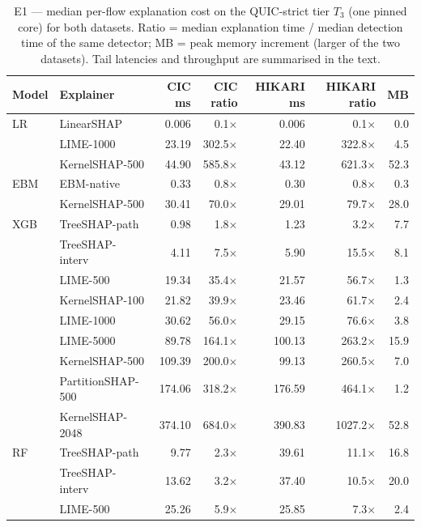 \begin{table}[!htbp]
\centering
\caption{E1 --- median per-flow explanation cost on the QUIC-strict tier $T_3$ (one pinned core) for both datasets. Ratio = median explanation time / median detection time of the same detector; MB = peak memory increment (larger of the two datasets). Tail latencies and throughput are summarised in the text.}
\label{tab:cost}
\scriptsize
\setlength{\tabcolsep}{3.5pt}
\begin{tabular}{llrrrrr}
\toprule
\textbf{Model} & \textbf{Explainer} & \textbf{CIC ms} & \textbf{CIC ratio} & \textbf{HIKARI ms} & \textbf{HIKARI ratio} & \textbf{MB} \\
\midrule
LR & LinearSHAP & 0.006 & 0.1$\times$ & 0.006 & 0.1$\times$ & 0.0 \\
 & LIME-1000 & 23.19 & 302.5$\times$ & 22.40 & 322.8$\times$ & 4.5 \\
 & KernelSHAP-500 & 44.90 & 585.8$\times$ & 43.12 & 621.3$\times$ & 52.3 \\
\midrule
EBM & EBM-native & 0.33 & 0.8$\times$ & 0.30 & 0.8$\times$ & 0.3 \\
 & KernelSHAP-500 & 30.41 & 70.0$\times$ & 29.01 & 79.7$\times$ & 28.0 \\
\midrule
XGB & TreeSHAP-path & 0.98 & 1.8$\times$ & 1.23 & 3.2$\times$ & 7.7 \\
 & TreeSHAP-interv & 4.11 & 7.5$\times$ & 5.90 & 15.5$\times$ & 8.1 \\
 & LIME-500 & 19.34 & 35.4$\times$ & 21.57 & 56.7$\times$ & 1.3 \\
 & KernelSHAP-100 & 21.82 & 39.9$\times$ & 23.46 & 61.7$\times$ & 2.4 \\
 & LIME-1000 & 30.62 & 56.0$\times$ & 29.15 & 76.6$\times$ & 3.8 \\
 & LIME-5000 & 89.78 & 164.1$\times$ & 100.13 & 263.2$\times$ & 15.9 \\
 & KernelSHAP-500 & 109.39 & 200.0$\times$ & 99.13 & 260.5$\times$ & 7.0 \\
 & PartitionSHAP-500 & 174.06 & 318.2$\times$ & 176.59 & 464.1$\times$ & 1.2 \\
 & KernelSHAP-2048 & 374.10 & 684.0$\times$ & 390.83 & 1027.2$\times$ & 52.8 \\
\midrule
RF & TreeSHAP-path & 9.77 & 2.3$\times$ & 39.61 & 11.1$\times$ & 16.8 \\
 & TreeSHAP-interv & 13.62 & 3.2$\times$ & 37.40 & 10.5$\times$ & 20.0 \\
 & LIME-500 & 25.26 & 5.9$\times$ & 25.85 & 7.3$\times$ & 2.4 \\

\end{tabular}
\end{table}
